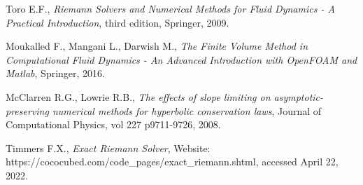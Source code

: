 \documentclass[10pt,letterpaper,notitlepage]{article}
\numberwithin{equation}{section}
\begin{document}
\newpage
\begin{thebibliography}{1}
	
	
	 Toro E.F., {\em Riemann Solvers and Numerical Methods for Fluid Dynamics - A Practical Introduction}, third edition, Springer, 2009.
	
	 Moukalled F.,  Mangani L., Darwish M., {\em The Finite Volume Method in Computational Fluid Dynamics - An Advanced Introduction with OpenFOAM and Matlab}, Springer, 2016.
	
	 McClarren R.G., Lowrie R.B., {\em The effects of slope limiting on asymptotic-preserving numerical methods for hyperbolic conservation laws}, Journal of Computational Physics, vol 227 p9711-9726, 2008.
	
	 Timmers F.X., {\em Exact Riemann Solver}, Website: https://cococubed.com/code\_pages/exact\_riemann.shtml, accessed April 22, 2022.
	
	   
\end{thebibliography}
\end{document}
